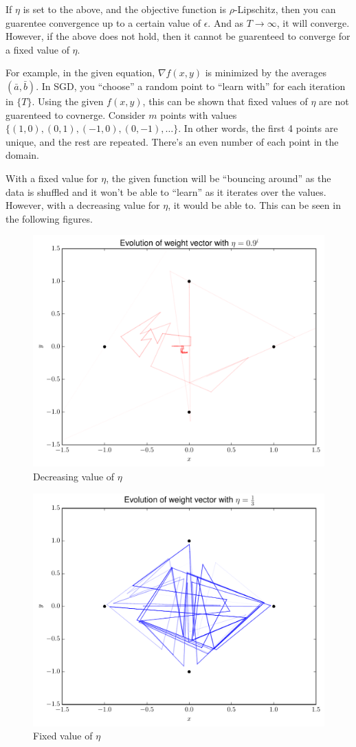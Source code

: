 \documentclass[12pt]{article}
\newcommand{\grad}{\nabla}
\begin{document}
\begin{enumerate}
\begin{enumerate}
If $\eta$ is set to the above, and the objective function is $\rho$-Lipschitz, then you can guarentee convergence up to a certain value of $\epsilon$. And as $T\rightarrow \infty$, it will converge. However, if the above does not hold, then it cannot be guarenteed to converge for a fixed value of $\eta$. 

For example, in the given equation, $\grad f(x,y)$ is minimized by the averages $(\bar{a}, \bar{b})$. In SGD, you ``choose'' a random point to ``learn with'' for each iteration in $\{ T \}$. Using the given $f(x,y)$, this can be shown that fixed values of $\eta$ are not guarenteed to covnerge. Consider $m$ points with values $\{ (1,0), (0,1), (-1,0), (0,-1), \ldots \}$. In other words, the first 4 points are unique, and the rest are repeated. There's an even number of each point in the domain. 

With a fixed value for $\eta$, the given function will be ``bouncing around'' as the data is shuffled and it won't be able to ``learn'' as it iterates over the values. However, with a decreasing value for $\eta$, it would be able to. This can be seen in the following figures.

\begin{figure}[H]
\centering
\includegraphics[width=.7\linewidth]{Decreasing.pdf}
\caption{Decreasing value of $\eta$}
\label{fig:dec}
\end{figure}


\begin{figure}[H]
\centering
\includegraphics[width=.7\linewidth]{Fixed.pdf}
\caption{Fixed value of $\eta$}
\label{fig:fix}
\end{figure}


\end{enumerate}
\end{enumerate}
\end{document}
